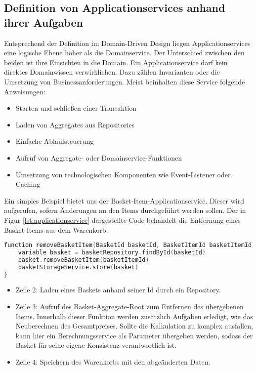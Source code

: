 \subsection{Definition von Applicationservices anhand ihrer Aufgaben}

Entsprechend der Definition im Domain-Driven Design liegen Applicationservices eine logische Ebene höher als die Domainservice. Der Unterschied zwischen den beiden ist ihre Einsichten in die Domain. Ein Applicationservice darf kein direktes Domainwissen verwirklichen. Dazu zählen Invarianten oder die Umsetzung von Businessanforderungen.
Meist beinhalten diese Service folgende Anweisungen:

\begin{itemize}[noitemsep,nolistsep]
	\item Starten und schließen einer Transaktion
	\item Laden von Aggregates aus Repositories
	\item Einfache Ablaufsteuerung
	\item Aufruf von Aggregate- oder Domainservice-Funktionen
	\item Umsetzung von technologischen Komponenten wie Event-Listener oder Caching
\end{itemize}

Ein simples Beispiel bietet uns der Basket-Item-Applicationservice. Dieser wird aufgerufen, sofern Änderungen an den Items durchgeführt werden sollen. Der in Figur \ref{lst:applicationservice} dargestellte Code behandelt die Entfernung eines Basket-Items aus dem Warenkorb.

\begin{minipage}{\linewidth} %
	\begin{lstlisting}[caption={Eine Beispielsfunktion des BasketItem-Applikationservice}, label={lst:applicationservice}, language=Kotlin]
function removeBasketItem(BasketId basketId, BasketItemId basketItemId) {
	variable basket = basketRepository.findById(basketId)
	basket.removeBasketItem(basketItemId)
	basketStorageService.store(basket)
}
	\end{lstlisting}
\end{minipage}

\begin{itemize}[noitemsep,nolistsep]
	\item Zeile 2: Laden eines Baskets anhand seiner Id durch ein Repository. 
	\item Zeile 3: Aufruf des Basket-Aggregate-Root zum Entfernen des übergebenen Items. Innerhalb dieser Funktion werden zusätzlich Aufgaben erledigt, wie das Neuberechnen des Gesamtpreises. Sollte die Kalkulation zu komplex ausfallen, kann hier ein Berechnungsservice als Parameter übergeben werden, sodass der Basket für seine eigene Konsistenz verantwortlich ist. 
	\item Zeile 4: Speichern des Warenkorbs mit den abgeänderten Daten.
\end{itemize}

